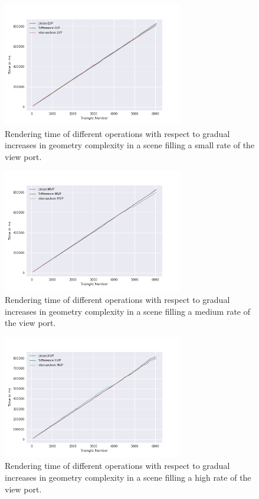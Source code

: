 \documentclass[a4paper,11pt,oneside]{article}
\begin{document}
\begin{figure}[H]
	\centering
	\includegraphics[width=0.7\textwidth]{section5/plots/naive_csg_lvp.png}
	\caption{Rendering time of different operations with respect to gradual increases in geometry complexity in a scene filling a small rate of the view port.}
	\label{sec5.1:naive_operations_lvp}
\end{figure}

\begin{figure}[H]
	\centering
	\includegraphics[width=0.7\textwidth]{section5/plots/naive_csg_mvp.png}
	\caption{Rendering time of different operations with respect to gradual increases in geometry complexity in a scene filling a medium rate of the view port.}
	\label{sec5.1:naive_operations_mvp}
\end{figure}

\begin{figure}[H]
	\centering
	\includegraphics[width=0.7\textwidth]{section5/plots/naive_csg_hvp.png}
	\caption{Rendering time of different operations with respect to gradual increases in geometry complexity in a scene filling a high rate of the view port.}
	\label{sec5.1:naive_operations_hvp}
\end{figure}
\end{document}

